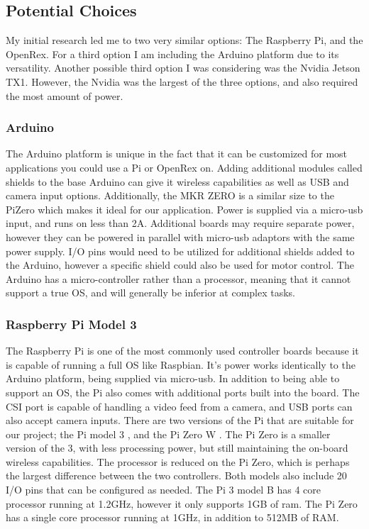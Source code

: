 \documentclass[letterpaper, 10, draftclsnofoot, onecolumn, compsoc]{IEEEtran}
\begin{document}
\subsection{Potential Choices}

My initial research led me to two very similar options: The 
Raspberry Pi, and the OpenRex. For a third option I am including 
the Arduino platform due to its versatility. Another possible third 
option I was considering was the Nvidia Jetson TX1. However, the 
Nvidia was the largest of the three options, and also required the 
most amount of power. 

\subsubsection{Arduino}


The Arduino platform\cite{r1} is unique in the fact that it can be 
customized for most applications you could use a Pi or OpenRex on. 
Adding additional modules called shields to the base Arduino can 
give it wireless capabilities as well as USB and camera input 
options. Additionally, the MKR ZERO is a similar size to the PiZero 
which makes it ideal for our application. Power is supplied via a 
micro-usb input, and runs on less than 2A. Additional boards may 
require separate power, however they can be powered in parallel 
with micro-usb adaptors with the same power supply. I/O pins would 
need to be utilized for additional shields added to the Arduino, 
however a specific shield could also be used for motor control. The 
Arduino has a micro-controller rather than a processor, meaning 
that it cannot support a true OS, and will generally be inferior at 
complex tasks. 



\subsubsection{Raspberry Pi Model 3}

The Raspberry Pi is one of the most commonly used controller boards 
because it is capable of running a full OS like Raspbian. It's 
power works identically to the Arduino platform, being supplied via 
micro-usb. In addition to being able to support an OS, the Pi also 
comes with additional ports built into the board. The CSI port is 
capable of handling a video feed from a camera, and USB ports can 
also accept camera inputs. There are two versions of the Pi that 
are suitable for our project; the Pi model 3 \cite{r2}, and 
the Pi Zero W \cite{r3}. The Pi Zero is a smaller version of the 3, 
with less processing power, but still maintaining the on-board 
wireless capabilities. 
The processor is reduced on the Pi Zero, which is perhaps the 
largest difference between the two controllers. Both models also 
include 20 I/O pins that can be configured as needed. The Pi 3 
model B has 4 core processor running at 1.2GHz, however it only 
supports 1GB of ram. The Pi Zero has a single core processor 
running at 1GHz, in addition to 512MB of RAM.   
\end{document}
